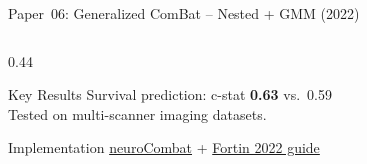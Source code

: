 \documentclass[aspectratio=169,xcolor=dvipsnames]{beamer}
\begin{document}
\begin{frame}{Paper~06: Generalized ComBat -- Nested + GMM (2022)}
\begin{columns}
\begin{column}{0.44\textwidth}
            \vspace{0.2em}

            \begin{block}{\scriptsize Key Results}
                \scriptsize
                Survival prediction: c-stat \textbf{0.63} vs.\ 0.59\\[0.1em]
                Tested on multi-scanner imaging datasets.
            \end{block}

            \vspace{0.2em}

            \begin{exampleblock}{\scriptsize {} Implementation}
                \scriptsize \href{https://github.com/Jfortin1/neuroCombat}{neuroCombat} + \href{https://doi.org/10.2967/jnumed.121.262464}{Fortin 2022 guide}
            \end{exampleblock}
        \end{column}
    \end{columns}
\end{frame}
\end{document}
